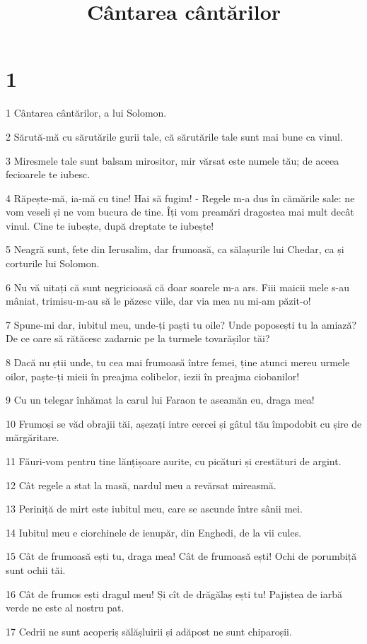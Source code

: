 

\title{Cântarea cântărilor}


\chapter{1}

\par 1 Cântarea cântărilor, a lui Solomon.
\par 2 Sărută-mă cu sărutările gurii tale, că sărutările tale sunt mai bune ca vinul.
\par 3 Miresmele tale sunt balsam mirositor, mir vărsat este numele tău; de aceea fecioarele te iubesc.
\par 4 Răpește-mă, ia-mă cu tine! Hai să fugim! - Regele m-a dus în cămările sale: ne vom veseli și ne vom bucura de tine. Îți vom preamări dragostea mai mult decât vinul. Cine te iubește, după dreptate te iubește!
\par 5 Neagră sunt, fete din Ierusalim, dar frumoasă, ca sălașurile lui Chedar, ca și corturile lui Solomon.
\par 6 Nu vă uitați că sunt negricioasă că doar soarele m-a ars. Fiii maicii mele s-au mâniat, trimisu-m-au să le păzesc viile, dar via mea nu mi-am păzit-o!
\par 7 Spune-mi dar, iubitul meu, unde-ți paști tu oile? Unde poposești tu la amiază? De ce oare să rătăcesc zadarnic pe la turmele tovarășilor tăi?
\par 8 Dacă nu știi unde, tu cea mai frumoasă între femei, ține atunci mereu urmele oilor, paște-ți mieii în preajma colibelor, iezii în preajma ciobanilor!
\par 9 Cu un telegar înhămat la carul lui Faraon te aseamăn eu, draga mea!
\par 10 Frumoși se văd obrajii tăi, așezați intre cercei și gâtul tău împodobit cu șire de mărgăritare.
\par 11 Făuri-vom pentru tine lănțișoare aurite, cu picături și crestături de argint.
\par 12 Cât regele a stat la masă, nardul meu a revărsat mireasmă.
\par 13 Periniță de mirt este iubitul meu, care se ascunde între sânii mei.
\par 14 Iubitul meu e ciorchinele de ienupăr, din Enghedi, de la vii cules.
\par 15 Cât de frumoasă ești tu, draga mea! Cât de frumoasă ești! Ochi de porumbiță sunt ochii tăi.
\par 16 Cât de frumos ești dragul meu! Și cît de drăgălaș ești tu! Pajiștea de iarbă verde ne este al nostru pat.
\par 17 Cedrii ne sunt acoperiș sălășluirii și adăpost ne sunt chiparoșii.

